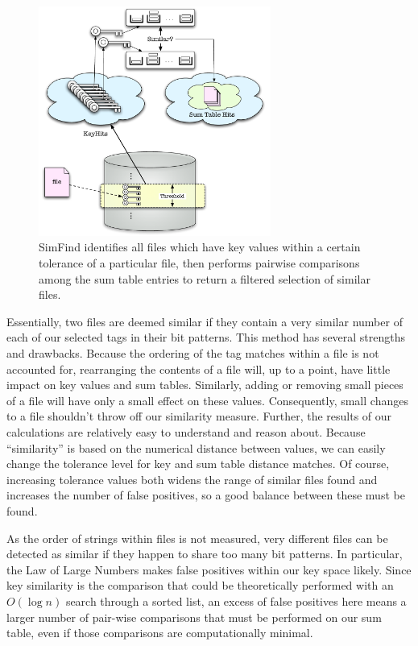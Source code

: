 \documentclass[10pt, twocolumn]{article}
\begin{document}
 \begin{figure}[h] 
 \centering
\includegraphics[width= 3in]{simFind.pdf}
\caption{SimFind identifies all files which have key values within a certain tolerance of a particular file, then performs pairwise comparisons among the sum table entries to return a filtered selection of similar files.}
\label{simFind} 
\end{figure}   

Essentially, two files are deemed similar if they contain a very similar number of each of our selected tags in their bit patterns.  This method has several strengths and drawbacks.  Because the ordering of the tag matches within a file is not accounted for, rearranging the contents of a file will, up to a point, have little impact on key values and sum tables.  Similarly, adding or removing small pieces of a file will have only a small effect on these values.  Consequently, small changes to a file shouldn't throw off our similarity measure.  Further, the results of our calculations are relatively easy to understand and reason about.  Because ``similarity'' is based on the numerical distance between values, we can easily change the tolerance level for key and sum table distance matches.  Of course, increasing tolerance values both widens the range of similar files found and increases the number of false positives, so a good balance between these must be found.

As the order of strings within files is not measured, very different files can be detected as similar if they happen to share too many bit patterns.  In particular, the Law of Large Numbers makes false positives within our key space likely.  Since key similarity is the comparison that could be theoretically performed with an $O(\log n)$ search through a sorted list, an excess of false positives here means a larger number of pair-wise comparisons that must be performed on our sum table, even if those comparisons are computationally minimal.
\end{document}
